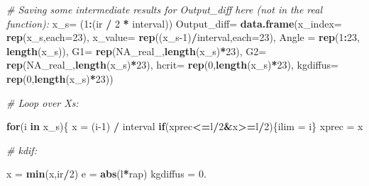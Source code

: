 \documentclass[
]{book}
\newenvironment{Shaded}{\begin{snugshade}}{\end{snugshade}}
\newcommand{\CommentTok}[1]{\textcolor[rgb]{0.56,0.35,0.01}{\textit{#1}}}
\newcommand{\ControlFlowTok}[1]{\textcolor[rgb]{0.13,0.29,0.53}{\textbf{#1}}}
\newcommand{\DataTypeTok}[1]{\textcolor[rgb]{0.13,0.29,0.53}{#1}}
\newcommand{\DecValTok}[1]{\textcolor[rgb]{0.00,0.00,0.81}{#1}}
\newcommand{\FloatTok}[1]{\textcolor[rgb]{0.00,0.00,0.81}{#1}}
\newcommand{\KeywordTok}[1]{\textcolor[rgb]{0.13,0.29,0.53}{\textbf{#1}}}
\newcommand{\NormalTok}[1]{#1}
\newcommand{\OperatorTok}[1]{\textcolor[rgb]{0.81,0.36,0.00}{\textbf{#1}}}
\newcommand{\OtherTok}[1]{\textcolor[rgb]{0.56,0.35,0.01}{#1}}
\newcommand{\StringTok}[1]{\textcolor[rgb]{0.31,0.60,0.02}{#1}}
\begin{document}
\begin{Shaded}
\begin{Highlighting}[]
\CommentTok{# Saving some intermediate results for Output_diff here (not in the real function):}
\NormalTok{x_s=}\StringTok{ }\NormalTok{(}\DecValTok{1}\OperatorTok{:}\NormalTok{(ir }\OperatorTok{/}\StringTok{ }\DecValTok{2} \OperatorTok{*}\StringTok{ }\NormalTok{interval))}
\NormalTok{Output_diff=}\StringTok{ }\KeywordTok{data.frame}\NormalTok{(}\DataTypeTok{x_index=} \KeywordTok{rep}\NormalTok{(x_s,}\DataTypeTok{each=}\DecValTok{23}\NormalTok{),}
                   \DataTypeTok{x_value=} \KeywordTok{rep}\NormalTok{((x_s}\DecValTok{-1}\NormalTok{)}\OperatorTok{/}\NormalTok{interval,}\DataTypeTok{each=}\DecValTok{23}\NormalTok{),}
                   \DataTypeTok{Angle =} \KeywordTok{rep}\NormalTok{(}\DecValTok{1}\OperatorTok{:}\DecValTok{23}\NormalTok{, }\KeywordTok{length}\NormalTok{(x_s)),}
                   \DataTypeTok{G1=} \KeywordTok{rep}\NormalTok{(}\OtherTok{NA_real_}\NormalTok{,}\KeywordTok{length}\NormalTok{(x_s)}\OperatorTok{*}\DecValTok{23}\NormalTok{),}
                   \DataTypeTok{G2=} \KeywordTok{rep}\NormalTok{(}\OtherTok{NA_real_}\NormalTok{,}\KeywordTok{length}\NormalTok{(x_s)}\OperatorTok{*}\DecValTok{23}\NormalTok{),}
                   \DataTypeTok{hcrit=} \KeywordTok{rep}\NormalTok{(}\DecValTok{0}\NormalTok{,}\KeywordTok{length}\NormalTok{(x_s)}\OperatorTok{*}\DecValTok{23}\NormalTok{),}
                   \DataTypeTok{kgdiffus=} \KeywordTok{rep}\NormalTok{(}\DecValTok{0}\NormalTok{,}\KeywordTok{length}\NormalTok{(x_s)}\OperatorTok{*}\DecValTok{23}\NormalTok{))}


\CommentTok{# Loop over Xs:}

\ControlFlowTok{for}\NormalTok{(i }\ControlFlowTok{in}\NormalTok{ x_s)\{}
\NormalTok{  x =}\StringTok{ }\NormalTok{(i}\DecValTok{-1}\NormalTok{) }\OperatorTok{/}\StringTok{ }\NormalTok{interval}
  \ControlFlowTok{if}\NormalTok{(xprec}\OperatorTok{<=}\NormalTok{l}\OperatorTok{/}\DecValTok{2}\OperatorTok{&}\NormalTok{x}\OperatorTok{>=}\NormalTok{l}\OperatorTok{/}\DecValTok{2}\NormalTok{)\{ilim =}\StringTok{ }\NormalTok{i\}}
\NormalTok{  xprec =}\StringTok{ }\NormalTok{x}
  
  \CommentTok{# kdif:}
  
\NormalTok{  x =}\StringTok{ }\KeywordTok{min}\NormalTok{(x,ir}\OperatorTok{/}\DecValTok{2}\NormalTok{)}
\NormalTok{  e =}\StringTok{ }\KeywordTok{abs}\NormalTok{(l}\OperatorTok{*}\NormalTok{rap)}
\NormalTok{  kgdiffus =}\StringTok{ }\FloatTok{0.}
  

\end{Highlighting}
\end{Shaded}
\end{document}
